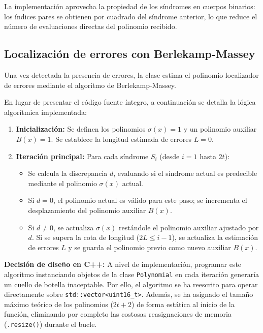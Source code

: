La implementación aprovecha la propiedad de los síndromes en cuerpos binarios: los índices pares se obtienen por cuadrado del síndrome anterior, lo que reduce el número de evaluaciones directas del polinomio recibido.

\subsection{Localización de errores con Berlekamp-Massey}

Una vez detectada la presencia de errores, la clase estima el polinomio localizador de errores mediante el algoritmo de Berlekamp-Massey. 

En lugar de presentar el código fuente íntegro, a continuación se detalla la lógica algorítmica implementada:

\begin{enumerate}
    \item \textbf{Inicialización:} Se definen los polinomios $\sigma(x) = 1$ y un polinomio auxiliar $B(x) = 1$. Se establece la longitud estimada de errores $L = 0$.
    \item \textbf{Iteración principal:} Para cada síndrome $S_i$ (desde $i = 1$ hasta $2t$):
    \begin{itemize}
        \item Se calcula la discrepancia $d$, evaluando si el síndrome actual es predecible mediante el polinomio $\sigma(x)$ actual.
        \item Si $d = 0$, el polinomio actual es válido para este paso; se incrementa el desplazamiento del polinomio auxiliar $B(x)$.
        \item Si $d \neq 0$, se actualiza $\sigma(x)$ restándole el polinomio auxiliar ajustado por $d$. Si se supera la cota de longitud ($2L \leq i - 1$), se actualiza la estimación de errores $L$ y se guarda el polinomio previo como nuevo auxiliar $B(x)$.
    \end{itemize}
\end{enumerate}

\textbf{Decisión de diseño en C++:} A nivel de implementación, programar este algoritmo instanciando objetos de la clase \texttt{Polynomial} en cada iteración generaría un cuello de botella inaceptable. Por ello, el algoritmo se ha reescrito para operar directamente sobre \texttt{std::vector<uint16\_t>}. Además, se ha asignado el tamaño máximo teórico de los polinomios ($2t+2$) de forma estática al inicio de la función, eliminando por completo las costosas reasignaciones de memoria (\texttt{.resize()}) durante el bucle.

